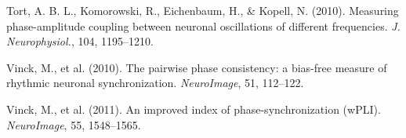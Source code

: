 \documentclass[11pt]{article}
\begin{document}
\begin{list}{}{\setlength{\itemsep}{1pt}\setlength{\leftmargin}{1.2em}\setlength{\itemindent}{-1.2em}}
\item Tort, A. B. L., Komorowski, R., Eichenbaum, H., \& Kopell, N. (2010). Measuring phase-amplitude coupling between neuronal oscillations of different frequencies. \emph{J. Neurophysiol.}, 104, 1195–1210.
\item Vinck, M., et al. (2010). The pairwise phase consistency: a bias-free measure of rhythmic neuronal synchronization. \emph{NeuroImage}, 51, 112–122.
\item Vinck, M., et al. (2011). An improved index of phase-synchronization (wPLI). \emph{NeuroImage}, 55, 1548–1565.
\end{list}\endgroup
\end{document}

